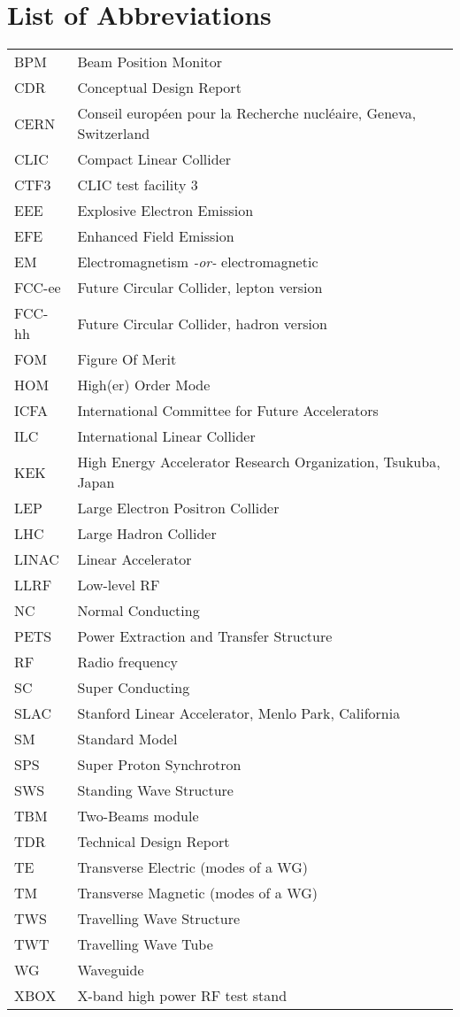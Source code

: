 \chapter*{List of Abbreviations}

\begin{tabular}{l l}
BPM		&	Beam Position Monitor\\
CDR		&	Conceptual Design Report\\
CERN	&	Conseil europ\'een pour la Recherche nucl\'eaire, Geneva, Switzerland\\
CLIC		&	Compact Linear Collider\\
CTF3	&	CLIC test facility 3\\
EEE		&	Explosive Electron Emission\\
EFE		&	Enhanced Field Emission\\
EM		&	Electromagnetism \textit{-or-} electromagnetic\\
FCC-ee	&	Future Circular Collider, lepton version\\
FCC-hh	&	Future Circular Collider, hadron version\\
FOM		&	Figure Of Merit\\
HOM		&	High(er) Order Mode\\
ICFA		&	International Committee for Future Accelerators\\
ILC		&	International Linear Collider\\
KEK		&	High Energy Accelerator Research Organization, Tsukuba, Japan      \\  
LEP		&	Large Electron Positron Collider\\
LHC		&	Large Hadron Collider \\
LINAC	&	Linear Accelerator\\
LLRF	&	Low-level RF\\
NC		&	Normal Conducting\\
PETS	&	Power Extraction and Transfer Structure\\
RF		&	Radio frequency\\
SC		&	Super Conducting\\
SLAC	&	Stanford Linear Accelerator, Menlo Park, California\\
SM		&	Standard Model\\
SPS		&	Super Proton Synchrotron\\
SWS		&	Standing Wave Structure\\
TBM		&	Two-Beams module\\
TDR		&	Technical Design Report\\
TE		&	Transverse Electric (modes of a WG)\\
TM		&	Transverse Magnetic (modes of a WG)\\
TWS		&	Travelling Wave Structure\\
TWT		&	Travelling Wave Tube\\
WG		&	Waveguide\\
XBOX	&	X-band high power RF test stand\\
\end{tabular}